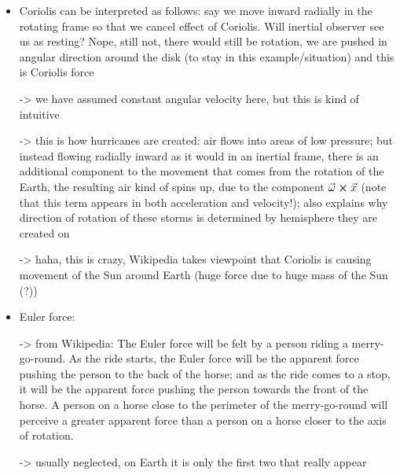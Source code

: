 \documentclass[../class_mech_main.tex]{subfiles}
\begin{document}
\begin{itemize}
    \item Coriolis can be interpreted as follows: say we move inward radially in the rotating frame so that we cancel effect of Coriolis. Will inertial observer see us as resting? Nope, still not, there would still be rotation, we are pushed in angular direction around the disk (to stay in this example/situation) and this is Coriolis force
    
    -> we have assumed constant angular velocity here, but this is kind of intuitive
    
    
    -> this is how hurricanes are created: air flows into areas of low pressure; but instead flowing radially inward as it would in an inertial frame, there is an additional component to the movement that comes from the rotation of the Earth, the resulting air kind of spins up, due to the component $\vec{\omega} \cross \vec{x}$ (note that this term appears in both acceleration and velocity!); also explains why direction of rotation of these storms is determined by hemisphere they are created on

    -> haha, this is crazy, Wikipedia takes viewpoint that Coriolis is causing movement of the Sun around Earth (huge force due to huge mass of the Sun (?))


    \item Euler force: 
    
    -> from Wikipedia: The Euler force will be felt by a person riding a merry-go-round. As the ride starts, the Euler force will be the apparent force pushing the person to the back of the horse; and as the ride comes to a stop, it will be the apparent force pushing the person towards the front of the horse. A person on a horse close to the perimeter of the merry-go-round will perceive a greater apparent force than a person on a horse closer to the axis of rotation. 
    
    -> usually neglected, on Earth it is only the first two that really appear
\end{itemize}


\end{document}
